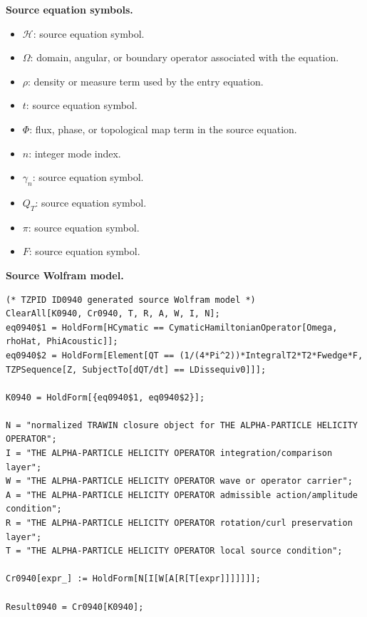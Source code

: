 \begin{minipage}[t]{0.49\linewidth}
\begingroup
\small
\raggedright
\textbf{Source equation symbols.}\par
\begin{itemize}[leftmargin=1.35em,itemsep=1pt,topsep=1pt,parsep=0pt]
    \item $\mathcal{H}$: source equation symbol.
    \item $\Omega$: domain, angular, or boundary operator associated with the equation.
    \item $\rho$: density or measure term used by the entry equation.
    \item $t$: source equation symbol.
    \item $\Phi$: flux, phase, or topological map term in the source equation.
    \item $n$: integer mode index.
    \item $\gamma_n$: source equation symbol.
    \item $Q_T$: source equation symbol.
    \item $\pi$: source equation symbol.
    \item $F$: source equation symbol.
\end{itemize}
\endgroup
\end{minipage}\hfill
\begin{minipage}[t]{0.47\linewidth}
\begingroup
\scriptsize
\raggedright
\textbf{Source Wolfram model.}\par
\begin{Verbatim}[fontsize=\tiny,breaklines=true,breakanywhere=true]
(* TZPID ID0940 generated source Wolfram model *)
ClearAll[K0940, Cr0940, T, R, A, W, I, N];
eq0940$1 = HoldForm[HCymatic == CymaticHamiltonianOperator[Omega, rhoHat, PhiAcoustic]];
eq0940$2 = HoldForm[Element[QT == (1/(4*Pi^2))*IntegralT2*T2*Fwedge*F, TZPSequence[Z, SubjectTo[dQT/dt] == LDissequiv0]]];

K0940 = HoldForm[{eq0940$1, eq0940$2}];

N = "normalized TRAWIN closure object for THE ALPHA-PARTICLE HELICITY OPERATOR";
I = "THE ALPHA-PARTICLE HELICITY OPERATOR integration/comparison layer";
W = "THE ALPHA-PARTICLE HELICITY OPERATOR wave or operator carrier";
A = "THE ALPHA-PARTICLE HELICITY OPERATOR admissible action/amplitude condition";
R = "THE ALPHA-PARTICLE HELICITY OPERATOR rotation/curl preservation layer";
T = "THE ALPHA-PARTICLE HELICITY OPERATOR local source condition";

Cr0940[expr_] := HoldForm[N[I[W[A[R[T[expr]]]]]]];

Result0940 = Cr0940[K0940];
\end{Verbatim}
\endgroup
\end{minipage}

